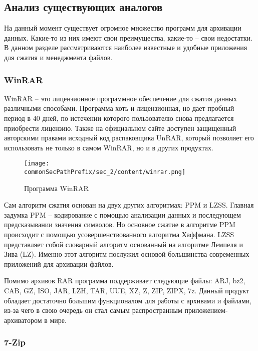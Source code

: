 \subsection{Анализ существующих аналогов}

На данный момент существует огромное множество программ для архивации данных. Какие-то из них имеют свои преимущества, какие-то -- свои недостатки.
В данном разделе рассматриваются наиболее известные и удобные приложения для сжатия и менеджмента файлов.

\subsubsection{WinRAR}

WinRAR -- это лицензионное программное обеспечение для сжатия данных различными способами. 
Программа хоть и лицензионная, но дает пробный период в 40 дней, по истечении которого пользователю снова предлагается приобрести лицензию.
Также на официальном сайте доступен защищенный авторскими правами исходный код распаковщика UnRAR, который позволяет его использовать не только в самом WinRAR, но и в других продуктах.

\begin{figure}[h]
    \centering
    \texttt{[image: \\commonSecPathPrefix/sec\_2/content/winrar.png]}
    \caption{Программа WinRAR}
    \label{fig:WinRAR}
\end{figure}



Сам алгоритм сжатия основан на двух других алгоритмах: PPM и LZSS. 
Главная задумка PPM -- кодирование с помощью анализации данных и последующем предсказывании значения символов. 
Но основное сжатие в алгоритме PPM происходит с помощью усовершенствованного алгоритма Хаффмана. 
LZSS представляет собой словарный алгоритм основанный на алгоритме Лемпеля и Зива (LZ). 
Именно этот алгоритм послужил основой большинства современных приложений для архивации файлов.



Помимо архивов RAR программа поддерживает следующие файлы: ARJ, bz2, CAB, GZ, ISO, JAR, LZH, TAR, UUE, XZ, Z, ZIP, ZIPX, 7z.
Данный продукт обладает достаточно большим функционалом для работы с архивами и файлами, из-за чего в свою очередь он стал самым распространным приложением-архиватором в мире.


\subsubsection{7-Zip}


